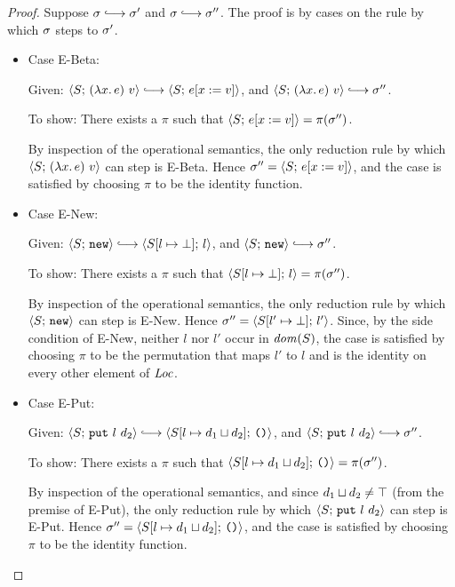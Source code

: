 \begin{proof}
  Suppose $\conf \parstepsto \conf'$ and $\conf \parstepsto \conf''$.
  The proof is by cases on the rule by which $\sigma$ steps to
  $\sigma'$.

  \begin{itemize}

    \item Case {\sc E-Beta}:

      Given:
      $\config{S}{\app{(\lam{x}{e})}{v}} \parstepsto \config{S}{\subst{e}{x}{v}}$,
      and $\config{S}{\app{(\lam{x}{e})}{v}} \parstepsto \conf''$.

      To show: There exists a $\pi$ such that
      $\langle S;\, e[x := v] \rangle = \pi(\sigma'')$.

      By inspection of the operational semantics, the only reduction
      rule by which $\langle S;\, (\lambda x.\,e)~v \rangle$ can step is
      {\sc E-Beta}.  Hence $\sigma'' = \langle S;\, e[x := v] \rangle$,
      and the case is satisfied by choosing $\pi$ to be the identity
      function.

      \item Case {\sc E-New}: 

      Given:
      $\config{S}{\NEW} \parstepsto \config{\extSRaw{S}{l}{\bot}}{l}$,
      and $\config{S}{\NEW} \parstepsto \conf''$.

      To show: There exists a $\pi$ such that
      $\langle S[l \mapsto \bot];\, l \rangle = \pi(\sigma'')$.

      By inspection of the operational semantics, the only reduction
      rule by which $\langle S;\, \mbox{\texttt{new}} \rangle$ can step is {\sc E-New}.  Hence
      $\sigma'' = \langle S[l' \mapsto \bot];\, l' \rangle$.  Since, by the
      side condition of {\sc E-New}, neither $l$ nor $l'$ occur in
      $\mathit{dom}(S)$, the case is satisfied by choosing $\pi$ to be the
      permutation that maps $l'$ to $l$ and is the identity on every
      other element of $\mathit{Loc}$.

      \item Case {\sc E-Put}:

      Given:
      $\config{S}{\putexp{l}{d_2}} \parstepsto \config{\extSRaw{S}{l}{\userlub{d_1}{d_2}}}{\unit}$,
      and $\config{S}{\putexp{l}{d_2}} \parstepsto \conf''$.

      To show: There exists a $\pi$ such that
      $\langle S[l \mapsto d_1 \sqcup d_2];\, \mbox{\texttt{()}} \rangle =
      \pi(\sigma'')$.

      By inspection of the operational semantics, and since
      $d_1 \sqcup d_2 \neq \top$ (from the premise of {\sc
      E-Put}), the only reduction rule by which
      $\langle S;\, \mbox{\texttt{put}}~l~d_2 \rangle$ can step is {\sc E-Put}.  Hence
      $\sigma'' = \langle S[l \mapsto d_1 \sqcup d_2];\, \mbox{\texttt{()}} \rangle$,
      and the case is satisfied by choosing $\pi$ to be the identity
      function.


\end{itemize}
\end{proof}
